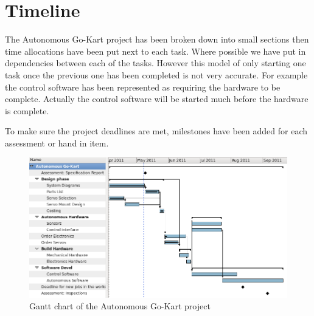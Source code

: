 \section{Timeline}
The Autonomous Go-Kart project has been broken down into small sections then time
allocations have been put next to each task. Where possible we have put in
dependencies between each of the tasks. However this model of only starting one
task once the previous one has been completed is not very accurate. For example
the control software has been represented as requiring the hardware to be
complete. Actually the control software will be started much before the hardware
is complete.

To make sure the project deadlines are met, milestones have been added for each
assessment or hand in item. 



  \begin{figure}[h]
    \centering
    \includegraphics[width=1.0\textwidth]{Images/Gantt.png}
    \caption{Gantt chart of the Autonomous Go-Kart project}
    \label{gantt_chart}
  \end{figure}
